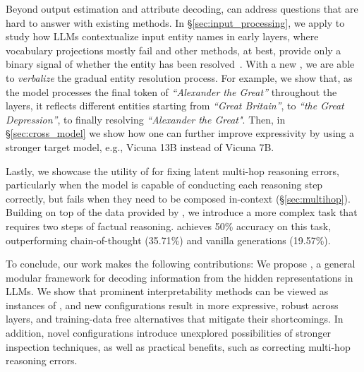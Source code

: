 \documentclass{article}
\theoremstyle{plain}
\theoremstyle{definition}
\theoremstyle{remark}
\begin{document}
Beyond output estimation and attribute decoding, \methodFamilyName{} can address questions that are hard to answer with existing methods. 
In \S\ref{sec:input_processing}, we apply \methodFamilyName{} to study how LLMs contextualize input entity names in early layers, where vocabulary projections mostly fail and other methods, at best, provide only a binary signal of whether the entity has been resolved~\cite{youssef2023give, tenney2019bert}. With a new \methodName{}, we are able to \textit{verbalize} the gradual entity resolution process.
For example, we show that, as the model processes the final token of \textit{``Alexander the Great''} throughout the layers, it reflects different entities starting from \textit{``Great Britain''}, to \textit{``the Great Depression''}, to finally resolving \textit{``Alexander the Great"}. Then, in \S\ref{sec:cross_model} we show how one can further improve \methodName{} expressivity by using a stronger target model, e.g., Vicuna 13B instead of Vicuna 7B.

Lastly, we showcase the utility of \methodFamilyName{} for fixing latent multi-hop reasoning errors, particularly when the model is capable of conducting each reasoning step correctly, but fails when they need to be composed in-context (\S\ref{sec:multihop}). Building on top of the data provided by \citet{hernandez2023linearity}, we introduce a more complex task that requires two steps of factual reasoning. \methodName{} achieves 50\% accuracy on this task, outperforming chain-of-thought \cite{wei2022chain} (35.71\%) and vanilla generations (19.57\%).

To conclude, our work makes the following contributions: We propose \methodFamilyName{}, a general modular framework for decoding information from the hidden representations in LLMs. We show that prominent interpretability methods can be viewed as instances of \methodFamilyName{}, and new configurations result in more expressive, robust across layers, and training-data free alternatives that mitigate their shortcomings.  In addition, novel configurations introduce unexplored possibilities of stronger inspection techniques, as well as practical benefits, such as correcting multi-hop reasoning errors.
\end{document}
